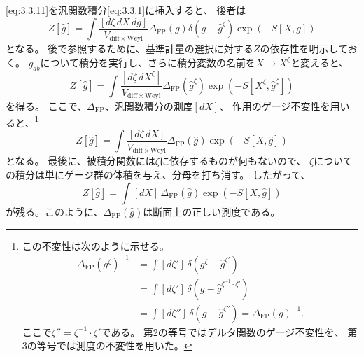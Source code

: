 \eqref{eq:3.3.11}を汎関数積分\eqref{eq:3.3.1}に挿入すると、
後者は
\begin{equation}
Z[\hat g]
=\int\frac{[d\zeta\,dX\,dg]}{V_{\mathrm{diff}\times\mathrm{Weyl}}}
\Delta_{\mathrm{FP}}(g)\delta(g-\hat g^\zeta)\exp(-S[X,g])
\tag{3.3.12}\label{eq:3.3.12}
\end{equation}
となる。
後で参照するために、基準計量の選択に対する$Z$の依存性を明示しておく。
$g_{ab}$について積分を実行し、さらに積分変数の名前を$X\to X^\zeta$と変えると、
\begin{equation}
Z[\hat g]
=\int\frac{[d\zeta\,dX^\zeta]}{V_{\mathrm{diff}\times\mathrm{Weyl}}}
\Delta_{\mathrm{FP}}(\hat g^\zeta)\exp(-S[X^\zeta,\hat g^\zeta])
\tag{3.3.13}\label{eq:3.3.13}
\end{equation}
を得る。
ここで、$\Delta_{\mathrm{FP}}$、汎関数積分の測度$[dX]$、
作用のゲージ不変性を用いると、\footnote[2]{この不変性は次のように示せる。
\[
\begin{aligned}
\Delta_{\mathrm{FP}}(g^\zeta)^{-1}
&=\int[d\zeta']\,\delta(g^\zeta-\hat g^{\zeta'})\\
&=\int[d\zeta']\,\delta(g-\hat g^{\zeta^{-1}\cdot\zeta'})\\
&=\int[d\zeta'']\,\delta(g-\hat g^{\zeta''})
=\Delta_{\mathrm{FP}}(g)^{-1}.
\end{aligned}
\]
ここで$\zeta''=\zeta^{-1}\cdot\zeta'$である。
第2の等号ではデルタ関数のゲージ不変性を、
第3の等号では測度の不変性を用いた。}
\begin{equation}
Z[\hat g]
=\int\frac{[d\zeta\,dX]}{V_{\mathrm{diff}\times\mathrm{Weyl}}}
\Delta_{\mathrm{FP}}(\hat g)\exp(-S[X,\hat g])
\tag{3.3.14}\label{eq:3.3.14}
\end{equation}
となる。
最後に、被積分関数には$\zeta$に依存するものが何もないので、
$\zeta$についての積分は単にゲージ群の体積を与え、分母を打ち消す。
したがって、
\begin{equation}
Z[\hat g]=\int[dX]\,\Delta_{\mathrm{FP}}(\hat g)\exp(-S[X,\hat g])
\tag{3.3.15}\label{eq:3.3.15}
\end{equation}
が残る。このように、$\Delta_{\mathrm{FP}}(\hat g)$は断面上の正しい測度である。

